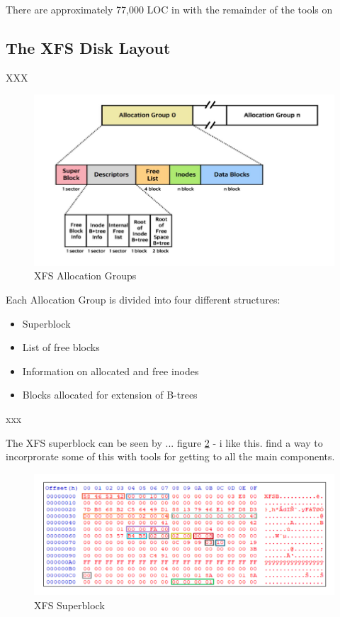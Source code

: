 There are approximately 77,000 LOC in  with the remainder of the tools on 

\subsection{The XFS Disk Layout}

XXX

\begin{figure}[h]
	\includegraphics[scale=0.6]{figures/xfs-allocation-group.pdf}
	\centering
	\caption{XFS Allocation Groups}
	\label{fig:xfs-allocation-group}
\end{figure}

Each Allocation Group is divided into four different structures:

\begin{itemize}
	\item Superblock
	\item List of free blocks
	\item Information on allocated and free inodes
	\item Blocks allocated for extension of B-trees
\end{itemize}

\noindent
xxx

The XFS superblock can be seen by ... figure \ref{fig:xfs-superblock} - i like this. find a way to incorprorate some of this with tools for getting to all the main components.

\begin{figure}[h]
	\includegraphics[scale=0.6]{figures/xfs-superblock.pdf}
	\centering
	\caption{XFS Superblock}
	\label{fig:xfs-superblock}
\end{figure}


